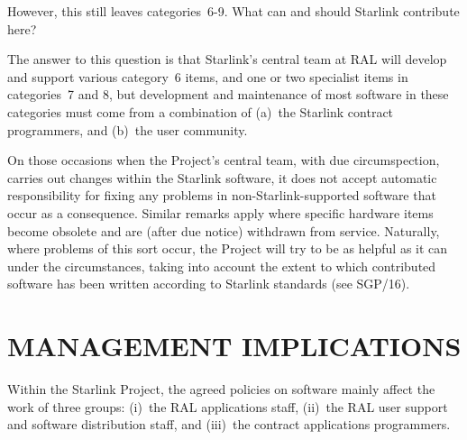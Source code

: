 \documentclass[nolof,11pt,noabs]{starlink}
\begin{document}
However, this still leaves categories~6-9.  What can and should Starlink
contribute here?

The answer to this question is that Starlink's central team at RAL will
develop and support various category~6 items, and one or two specialist
items in categories~7 and 8, but development and
maintenance of most software in these categories
must come from a combination of
(a)~the Starlink contract programmers, and (b)~the user community.

On those occasions when the Project's central team,
with due circumspection, carries out
changes within the Starlink software,
it does not accept automatic responsibility
for fixing any problems in non-Starlink-supported
software that occur as a consequence.
Similar remarks apply where specific hardware items
become obsolete and are (after due notice) withdrawn from service.
Naturally, where problems of this sort occur, the Project will try
to be as helpful as it can under the circumstances, taking into
account the extent to which contributed software has been written
according to Starlink standards (see SGP/16).

\section{MANAGEMENT IMPLICATIONS}
Within the Starlink Project, the agreed policies on software
mainly affect the work of three groups:
(i)~the RAL applications staff, (ii)~the RAL
user support and software distribution staff, and (iii)~the
contract applications programmers.
\end{document}
